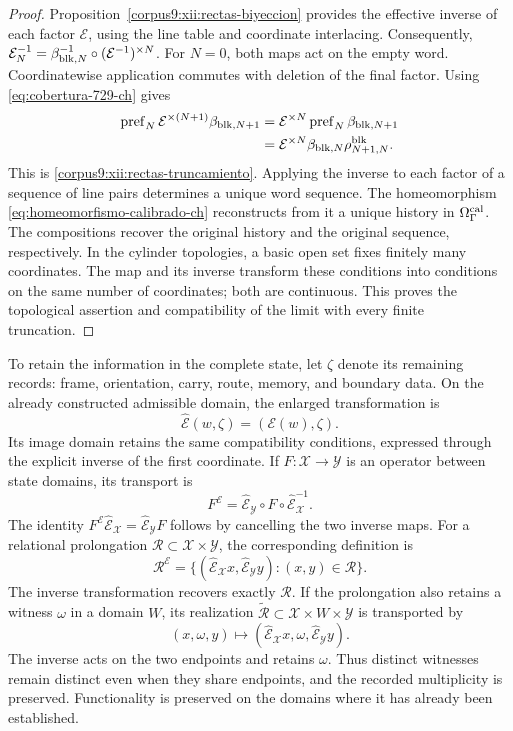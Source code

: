 \begin{proof}
Proposition~\ref{corpus9:xii:rectas-biyeccion} provides the effective
inverse of each factor \(\mathcal E\), using the line table and
coordinate interlacing. Consequently,
\(\mathcal E_N^{-1}=\beta_{{\rm blk},N}^{-1}
\circ(\mathcal E^{-1})^{\times N}\). For \(N=0\), both maps act on
the empty word. Coordinatewise application commutes with deletion of
the final factor. Using \eqref{eq:cobertura-729-ch} gives
\[
 \begin{aligned}
 \operatorname{pref}_N\mathcal E^{\times(N+1)}
           \beta_{{\rm blk},N+1}
 &=\mathcal E^{\times N}\operatorname{pref}_N
           \beta_{{\rm blk},N+1}\\
 &=\mathcal E^{\times N}\beta_{{\rm blk},N}
           \rho^{\rm blk}_{N+1,N}.
 \end{aligned}
\]
This is \eqref{corpus9:xii:rectas-truncamiento}. Applying the inverse
to each factor of a sequence of line pairs determines a unique word
sequence. The homeomorphism
\eqref{eq:homeomorfismo-calibrado-ch} reconstructs from it a unique
history in \(\Omega_\Gamma^{\rm cal}\). The compositions recover the
original history and the original sequence, respectively. In the
cylinder topologies, a basic open set fixes finitely many coordinates.
The map and its inverse transform these conditions into conditions on
the same number of coordinates; both are continuous. This proves the
topological assertion and compatibility of the limit with every finite
truncation.
\end{proof}

To retain the information in the complete state, let \(\zeta\) denote
its remaining records: frame, orientation, carry, route, memory, and
boundary data. On the already constructed admissible domain, the
enlarged transformation is
\[
 \widehat{\mathcal E}(w,\zeta)=(\mathcal E(w),\zeta).
\]
Its image domain retains the same compatibility conditions, expressed
through the explicit inverse of the first coordinate. If
\(F:\mathcal X\to\mathcal Y\) is an operator between state domains,
its transport is
\[
 F^{\mathcal E}
 =\widehat{\mathcal E}_{\mathcal Y}\circ F
       \circ\widehat{\mathcal E}_{\mathcal X}^{-1}.
\]
The identity \(F^{\mathcal E}\widehat{\mathcal E}_{\mathcal X}
=\widehat{\mathcal E}_{\mathcal Y}F\) follows by cancelling the two
inverse maps. For a relational prolongation
\(\mathcal R\subset\mathcal X\times\mathcal Y\), the corresponding
definition is
\[
 \mathcal R^{\mathcal E}
 =\{(\widehat{\mathcal E}_{\mathcal X}x,
       \widehat{\mathcal E}_{\mathcal Y}y):(x,y)\in\mathcal R\}.
\]
The inverse transformation recovers exactly \(\mathcal R\).
If the prolongation also retains a witness \(\omega\) in a domain
\(W\), its realization \(\widetilde{\mathcal R}\subset
\mathcal X\times W\times\mathcal Y\) is transported by
\[
 (x,\omega,y)\longmapsto
 (\widehat{\mathcal E}_{\mathcal X}x,\omega,
       \widehat{\mathcal E}_{\mathcal Y}y).
\]
The inverse acts on the two endpoints and retains \(\omega\). Thus
distinct witnesses remain distinct even when they share endpoints,
and the recorded multiplicity is preserved. Functionality is preserved
on the domains where it has already been established.

